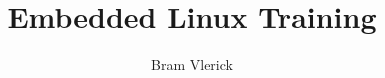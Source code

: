 \documentclass[11pt]{beamer}
\author{Bram Vlerick}
\title{Embedded Linux Training}
\institute{}
\begin{document}
\begin{frame}
\titlepage
\end{frame}



\end{document}
